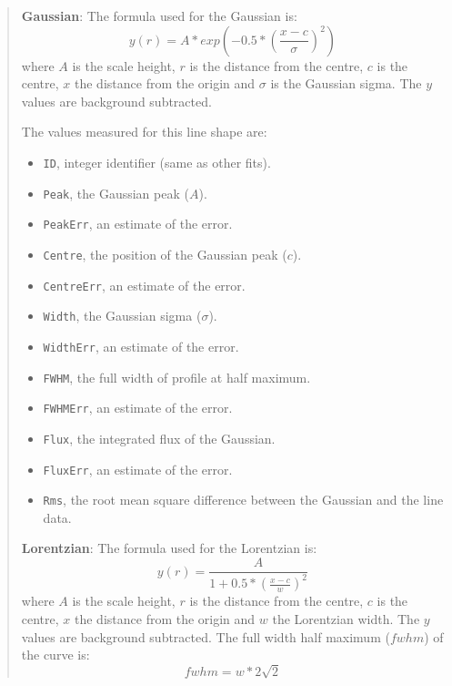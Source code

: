 \documentclass[twoside,11pt,nolof]{starlink}
\newcommand{\labelitem}[1]{\textbf{#1}}
\providecommand{\hitext}[1]{\texttt{#1}}
\begin{document}
\begin{quote}
 \labelitem{Gaussian}: The formula used for the Gaussian is:
 \[
  y(r) = A * exp\left( -0.5 * \left(\frac{x-c}{\sigma}\right)^{2}\right)
 \]
 where $A$ is the scale height, $r$ is the distance from the centre,
 $c$ is the centre, $x$ the distance from the origin and $\sigma$ is
 the Gaussian sigma. The $y$ values are background subtracted.

 The values measured for this line shape are:
 \begin{itemize}
   \item \hitext{ID}, integer identifier (same as other fits).
   \item \hitext{Peak}, the Gaussian peak ($A$).
   \item \hitext{PeakErr}, an estimate of the error.
   \item \hitext{Centre}, the position of the Gaussian peak ($c$).
   \item \hitext{CentreErr}, an estimate of the error.
   \item \hitext{Width}, the Gaussian sigma ($\sigma$).
   \item \hitext{WidthErr}, an estimate of the error.
   \item \hitext{FWHM}, the full width of profile at half maximum.
   \item \hitext{FWHMErr}, an estimate of the error.
   \item \hitext{Flux}, the integrated flux of the Gaussian.
   \item \hitext{FluxErr}, an estimate of the error.
   \item \hitext{Rms}, the root mean square difference between the
         Gaussian and the line data.
 \end{itemize}

 \labelitem{Lorentzian}: The formula used for the Lorentzian is:
 \[
  y(r) = \frac{A}{1+0.5*(\frac{x-c}{w})^{2}}
 \]
 where $A$ is the scale height, $r$ is the distance from the centre,
 $c$ is the centre, $x$ the distance from the origin and $w$ the
 Lorentzian width. The $y$ values are background subtracted. The full
 width half maximum ($fwhm$) of the curve is:
 \[
 fwhm = w*2\sqrt{2}
 \]


\end{quote}
\end{document}
